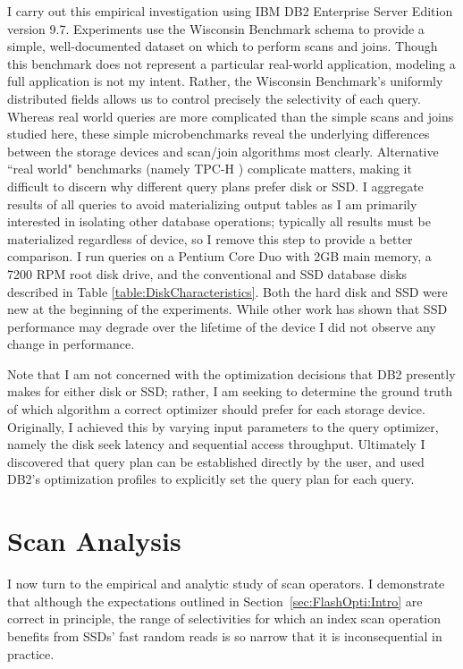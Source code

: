 I carry out this empirical investigation using IBM DB2 Enterprise Server Edition version 9.7.
Experiments use the Wisconsin Benchmark schema \cite{Bitton83benchmarkingdatabase} to provide a simple, well-documented dataset on which to perform scans and joins.
Though this benchmark does not represent a particular real-world application, modeling a full application is not my intent.
Rather, the Wisconsin Benchmark's uniformly distributed fields allows us to control precisely the selectivity of each query.
Whereas real world queries are more complicated than the simple scans and joins studied here, these simple microbenchmarks reveal the underlying differences between the storage devices and scan/join algorithms most clearly.
Alternative ``real world" benchmarks (namely TPC-H \cite{TPCH}) complicate matters, making it difficult to discern why different query plans prefer disk or SSD.
I aggregate results of all queries to avoid materializing output tables as I am primarily interested in isolating other database operations; typically all results must be materialized regardless of device, so I remove this step to provide a better comparison.
I run queries on a Pentium Core Duo with 2GB main memory, a 7200 RPM root disk drive, and the conventional and SSD database disks described in Table \ref{table:DiskCharacteristics}.
Both the hard disk and SSD were new at the beginning of the experiments.
While other work has shown that SSD performance may degrade over the lifetime of the device I did not observe any change in performance.

Note that I am not concerned with the optimization decisions that DB2 presently makes for either disk or SSD; rather, I am seeking to determine the ground truth of which algorithm a correct optimizer should prefer for each storage device. 
Originally, I achieved this by varying input parameters to the query optimizer, namely the disk seek latency and sequential access throughput.
Ultimately I discovered that query plan can be established directly by the user, and used DB2's optimization profiles to explicitly set the query plan for each query.

\section{Scan Analysis}
\label{sec:FlashOpti:Scans}

I now turn to the empirical and analytic study of scan operators.
I demonstrate that although the expectations outlined in Section~\ref{sec:FlashOpti:Intro} are correct in principle, the range of selectivities for which an index scan operation benefits from SSDs' fast random reads is so narrow that it is inconsequential in practice.

